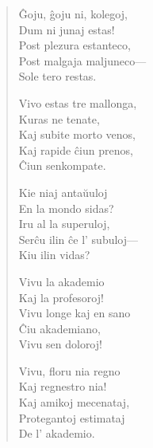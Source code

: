 {\centering{}\par}

\begin{verse}

\begin{patverse} \vin \vin 
Ĝoju, ĝoju ni, kolegoj,\\
Dum ni junaj estas!\\
Post plezura estanteco,\\
Post malgaja maljuneco---\\
Sole tero restas.
\end{patverse}

\pstars

\begin{patverse} \vin \vin 
Vivo estas tre mallonga,\\
Kuras ne tenate,\\
Kaj subite morto venos,\\
Kaj rapide ĉiun prenos,\\
Ĉiun senkompate.
\end{patverse}

\pstars

\begin{patverse} \vin \vin
Kie niaj antaŭuloj\\
En la mondo sidas?\\
Iru al la superuloj,\\
Serĉu ilin ĉe l' subuloj---\\
Kiu ilin vidas?
\end{patverse}

\pstars

\begin{patverse} \vin \vin
Vivu la akademio\\
Kaj la profesoroj!\\
Vivu longe kaj en sano\\
Ĉiu akademiano,\\
Vivu sen doloroj!
\end{patverse}

\pstars

\begin{patverse} \vin \vin
Vivu, floru nia regno\\
Kaj regnestro nia!\\
Kaj amikoj mecenataj,\\
Protegantoj estimataj\\
De l' akademio.
\end{patverse}


\end{verse}
